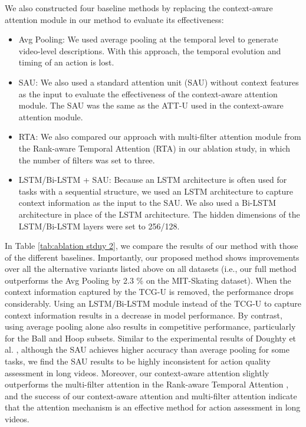 \documentclass[sigconf]{acmart}
\begin{document}
\vspace{5pt}

We also constructed four baseline methods by replacing the context-aware attention module in our method to evaluate its effectiveness:
\begin{itemize}
\item  Avg Pooling: We used average pooling at the temporal level to generate video-level descriptions. With this approach, the temporal evolution and timing of an action is lost.
\item SAU: We also used a standard attention unit (SAU) without context features as the input to evaluate the effectiveness of the context-aware attention module. The SAU was the same as the ATT-U used in the context-aware attention module.
\item RTA: We also compared our approach with multi-filter attention module from the  Rank-aware Temporal Attention (RTA) \cite{doughty2019pros} in our ablation study, in which the number of filters was set to three.
\item LSTM/Bi-LSTM + SAU: Because an LSTM architecture is often used for tasks with a sequential structure, we used an LSTM architecture to capture context information as the input to the SAU. We also used a Bi-LSTM architecture in place of the LSTM architecture. The hidden dimensions of the LSTM/Bi-LSTM layers were set to 256/128.
\end{itemize}

In Table \ref{tab:ablation stduy 2}, we compare the results of our method with those of the different baselines. Importantly, our proposed method shows improvements over all the alternative variants listed above on all datasets (i.e., our full method outperforms the Avg Pooling by 2.3 \% on the MIT-Skating dataset). When the context information captured by the TCG-U is removed, the performance drops considerably. Using an LSTM/Bi-LSTM module instead of the TCG-U to capture context information results in a decrease in model performance. By contrast, using average pooling alone also results in competitive performance, particularly for the Ball and Hoop subsets.
Similar to the experimental results of Doughty et al. \cite{doughty2019pros}, although the SAU achieves higher accuracy than average pooling for some tasks, we find the SAU results to be highly inconsistent for action quality assessment in long videos. 
Moreover, our context-aware attention slightly outperforms the multi-filter attention in the Rank-aware Temporal Attention \cite{doughty2019pros}, and the success of our context-aware attention and multi-filter attention indicate that the attention mechanism is an effective method for action assessment in long videos.
\end{document}
